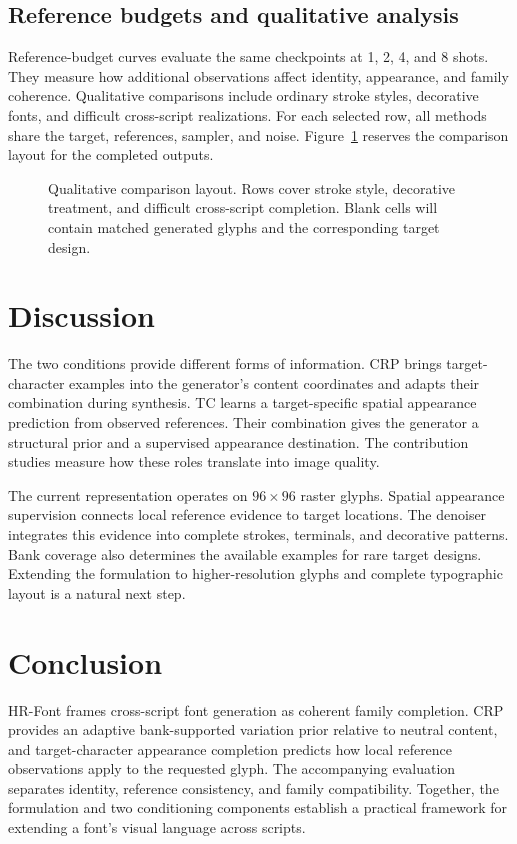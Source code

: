 \documentclass{article}
\newcommand{\method}{HR-Font\xspace}
\begin{document}
\subsection{Reference budgets and qualitative analysis}
Reference-budget curves evaluate the same checkpoints at 1, 2, 4, and 8 shots.
They measure how additional observations affect identity, appearance, and family coherence.
Qualitative comparisons include ordinary stroke styles, decorative fonts, and difficult cross-script realizations.
For each selected row, all methods share the target, references, sampler, and noise.
Figure~\ref{fig:qualitative} reserves the comparison layout for the completed outputs.

\begin{figure}[t]
\centering

\caption{Qualitative comparison layout. Rows cover stroke style, decorative treatment, and difficult cross-script completion. Blank cells will contain matched generated glyphs and the corresponding target design.}
\label{fig:qualitative}
\end{figure}

\section{Discussion}
The two conditions provide different forms of information.
CRP brings target-character examples into the generator's content coordinates and adapts their combination during synthesis.
TC learns a target-specific spatial appearance prediction from observed references.
Their combination gives the generator a structural prior and a supervised appearance destination.
The contribution studies measure how these roles translate into image quality.

The current representation operates on $96\times96$ raster glyphs.
Spatial appearance supervision connects local reference evidence to target locations.
The denoiser integrates this evidence into complete strokes, terminals, and decorative patterns.
Bank coverage also determines the available examples for rare target designs.
Extending the formulation to higher-resolution glyphs and complete typographic layout is a natural next step.

\section{Conclusion}
\method frames cross-script font generation as coherent family completion.
CRP provides an adaptive bank-supported variation prior relative to neutral content, and target-character appearance completion predicts how local reference observations apply to the requested glyph.
The accompanying evaluation separates identity, reference consistency, and family compatibility.
Together, the formulation and two conditioning components establish a practical framework for extending a font's visual language across scripts.
\end{document}
